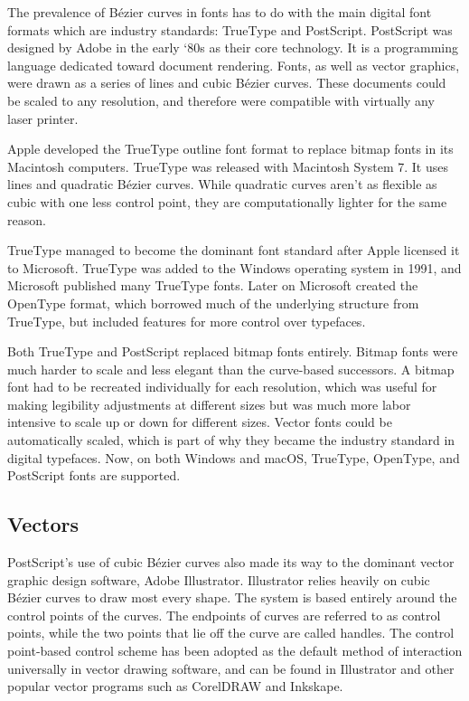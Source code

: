 \documentclass[12pt,letterpaper]{article}
\begin{document}
The prevalence of B\'ezier curves in fonts has to do with the main digital font formats which are industry standards: TrueType and PostScript. PostScript was designed by Adobe in the early ‘80s as their core technology. It is a programming language dedicated toward document rendering. Fonts, as well as vector graphics, were drawn as a series of lines and cubic B\'ezier curves. These documents could be scaled to any resolution, and therefore were compatible with virtually any laser printer. 

Apple developed the TrueType outline font format to replace bitmap fonts in its Macintosh computers. TrueType was released with Macintosh System 7. It uses lines and quadratic B\'ezier curves. While quadratic curves aren’t as flexible as cubic with one less control point, they are computationally lighter for the same reason.

TrueType managed to become the dominant font standard after Apple licensed it to Microsoft. TrueType was added to the Windows operating system in 1991, and Microsoft published many TrueType fonts. Later on Microsoft created the OpenType format, which borrowed much of the underlying structure from TrueType, but included features for more control over typefaces. 

Both TrueType and PostScript replaced bitmap fonts entirely. Bitmap fonts were much harder to scale and less elegant than the curve-based successors. A bitmap font had to be recreated individually for each resolution, which was useful for making legibility adjustments at different sizes but was much more labor intensive to scale up or down for different sizes. Vector fonts could be automatically scaled, which is part of why they became the industry standard in digital typefaces. Now, on both Windows and macOS, TrueType, OpenType, and PostScript fonts are supported.


\subsection{Vectors}

PostScript’s use of cubic B\'ezier curves also made its way to the dominant vector graphic design software, Adobe Illustrator. Illustrator relies heavily on cubic B\'ezier curves to draw most every shape. The system is based entirely around the control points of the curves. The endpoints of curves are referred to as control points, while the two points that lie off the curve are called handles. The control point-based control scheme has been adopted as the default method of interaction universally in vector drawing software, and can be found in Illustrator and other popular vector programs such as CorelDRAW and Inkskape. 
\end{document}
